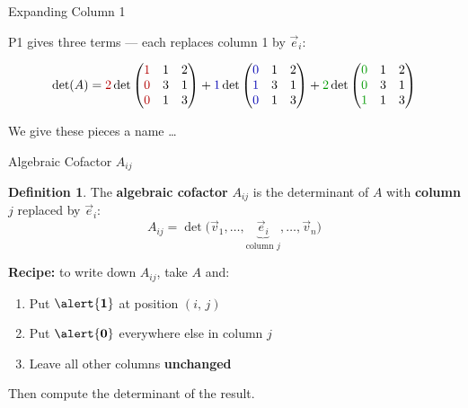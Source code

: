 \documentclass[10pt]{beamer}
\theoremstyle{definition}
\newtheorem{defi}{Definition}[section]
\newcommand{\x}[1]{\alert{\textbf{#1}}}
\newcommand{\rd}[1]{{\color{red!70!black}#1}}
\newcommand{\bl}[1]{{\color{blue!70!black}#1}}
\newcommand{\gn}[1]{{\color{green!60!black}#1}}
\begin{document}
\begin{frame}{Expanding Column 1}

P1 gives three terms --- each replaces column 1 by $\vec{e}_i$:

$$
\det(A)
= \rd{2}\det\begin{pmatrix} \rd{1} & 1 & 2 \\ \rd{0} & 3 & 1 \\ \rd{0} & 1 & 3 \end{pmatrix}
+ \bl{1}\det\begin{pmatrix} \bl{0} & 1 & 2 \\ \bl{1} & 3 & 1 \\ \bl{0} & 1 & 3 \end{pmatrix}
+ \gn{2}\det\begin{pmatrix} \gn{0} & 1 & 2 \\ \gn{0} & 3 & 1 \\ \gn{1} & 1 & 3 \end{pmatrix}
$$

\vfill

\begin{center}
\end{center}

\vfill

We give these pieces a name \ldots

\end{frame}


\begin{frame}{Algebraic Cofactor $A_{ij}$}

\begin{defi}
The \x{algebraic cofactor} $A_{ij}$ is the determinant of $A$ with \x{column $j$} replaced by $\vec{e}_i$:
$$
A_{ij} = \det\big(\vec{v}_1, \ldots, \underbrace{\vec{e}_i}_{\text{column }j}, \ldots, \vec{v}_n\big)
$$
\end{defi}

\vfill

\textbf{Recipe:} to write down $A_{ij}$, take $A$ and:
\begin{enumerate}
\item Put $\x{1}$ at position $(i,\, j)$
\item Put $\x{0}$ everywhere else in column $j$
\item Leave all other columns \x{unchanged}
\end{enumerate}

\vfill

Then compute the determinant of the result.

\end{frame}
\end{document}
